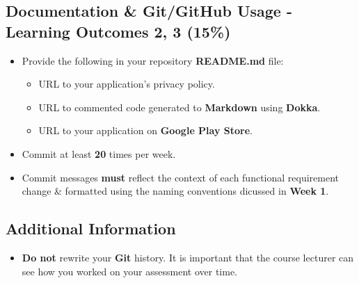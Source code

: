 \documentclass{article}
\begin{document}
\subsection*{Documentation \& Git/GitHub Usage - Learning Outcomes 2, 3 (15\%)}
\begin{itemize}
	\item Provide the following in your repository \textbf{README.md} file:
	      \begin{itemize}
		      \item URL to your application's privacy policy.
		      \item URL to commented code generated to \textbf{Markdown} using \textbf{Dokka}.
		      \item URL to your application on \textbf{Google Play Store}.
	      \end{itemize}
    \item Commit at least \textbf{20} times per week.
    \item Commit messages \textbf{must} reflect the context of each functional requirement change \& formatted using the naming conventions dicussed in \textbf{Week 1}.
\end{itemize}

\subsection*{Additional Information}
\begin{itemize}
	\item \textbf{Do not} rewrite your \textbf{Git} history. It is important that the course lecturer can see how you worked on your assessment over time.
\end{itemize}
\end{document}
